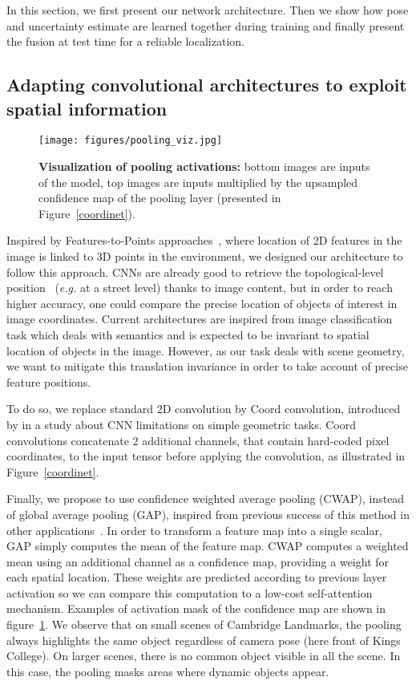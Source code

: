 \documentclass[10pt,twocolumn,letterpaper]{article}
\begin{document}
In this section, we first present our network architecture. Then we show how pose and uncertainty estimate are learned together during training and finally present the fusion at test time for a reliable localization.

\subsection{Adapting convolutional architectures to exploit spatial information}

\begin{figure}[h]
\label{pooling_activations}
   \texttt{[image: figures/pooling\_viz.jpg]}
   \caption{\textbf{Visualization of pooling activations:} bottom images are inputs of the model, top images are inputs multiplied by the upsampled confidence map of the pooling layer (presented in Figure~\ref{coordinet}).}
\end{figure}

Inspired by Features-to-Points approaches~\cite{hartley2003multiple}, where location of 2D features in the image is linked to 3D points in the environment, we designed our architecture to follow this approach. CNNs are already good to retrieve the topological-level position~\cite{Piasco2020} (\textit{e.g.} at a street level) thanks to image content, but in order to reach higher accuracy, one could compare the precise location of objects of interest in image coordinates. Current architectures are inspired from image classification task which deals with semantics and is expected to be invariant to spatial location of objects in the image. However, as our task deals with scene geometry, we want to mitigate this translation invariance in order to take account of precise feature positions.

To do so, we replace standard 2D convolution by Coord convolution, introduced by \cite{coordconv} in a study about CNN limitations on simple geometric tasks. Coord convolutions concatenate 2 additional channels, that contain hard-coded pixel coordinates, to the input tensor before applying the convolution, as illustrated in Figure~\ref{coordinet}.

Finally, we propose to use confidence weighted average pooling (CWAP), instead of global average pooling (GAP), inspired from previous success of this method in other applications~\cite{fc4}. In order to transform a feature map into a single scalar, GAP simply computes the mean of the feature map. CWAP computes a weighted mean using an additional channel as a confidence map, providing a weight for each spatial location. These weights are predicted according to previous layer activation so we can compare this computation to a low-cost self-attention mechanism. Examples of activation mask of the confidence map are shown in figure~\ref{pooling_activations}. We observe that on small scenes of Cambridge Landmarks, the pooling always highlights the same object regardless of camera pose (here front of Kings College). On larger scenes, there is no common object visible in all the scene. In this case, the pooling masks areas where dynamic objects appear.
\end{document}
